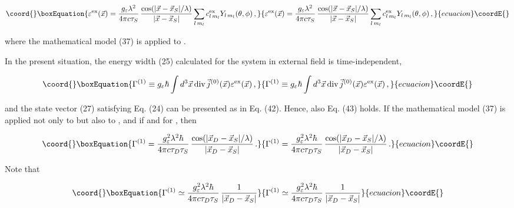 \documentclass[a4paper,12pt]{article}
\begin{document}
\begin{equation}\coord{}\boxEquation{
\varepsilon^{\rm ex}(\vec{x}) = \frac{g_\varepsilon \lambda^2}{4\pi c \tau_S}\, \frac{\cos (|\vec{x}-\vec{x}_S| /\lambda)}{|\vec{x}-\vec{x}_S|}\sum_{l\, m_l} c^{\rm ex}_{l\, m_l} Y_{l\,m_l}(\theta,\phi)\,,
}{
\varepsilon^{\rm ex}(\vec{x}) = \frac{g_\varepsilon \lambda^2}{4\pi c \tau_S}\, \frac{\cos (|\vec{x}-\vec{x}_S| /\lambda)}{|\vec{x}-\vec{x}_S|}\sum_{l\, m_l} c^{\rm ex}_{l\, m_l} Y_{l\,m_l}(\theta,\phi)\,,
}{ecuacion}\coordE{}\end{equation}

\ni where the mathematical model (37) is applied to \coordHE{}.

In the present situation, the energy width (25) calculated for the system in external field is time-independent,
      
\begin{equation}\coord{}\boxEquation{
\Gamma^{(1)} \equiv g_\varepsilon \hbar \int d^3\vec{x}\,{\rm div}\, \vec{j}^{(0)}(\vec{x}) \varepsilon^{\rm ex}(\vec{x}) \,,
}{
\Gamma^{(1)} \equiv g_\varepsilon \hbar \int d^3\vec{x}\,{\rm div}\, \vec{j}^{(0)}(\vec{x}) \varepsilon^{\rm ex}(\vec{x}) \,,
}{ecuacion}\coordE{}\end{equation}

\ni and the state vector (27) satisfying Eq. (24) can be presented as in Eq. (42). Hence, also Eq. (43) holds. If the mathematical model (37) is applied not only to \coordHE{} but also to \coordHE{}, and if \coordHE{} and \coordHE{} for \coordHE{}, then

\begin{equation}\coord{}\boxEquation{
\Gamma^{(1)} = \frac{g^2_\varepsilon \lambda^2 \hbar}{4\pi c \tau_D \tau_S}\, \frac{\cos (|\vec{x}_D - \vec{x}_S| /\lambda)}{|\vec{x}_D - \vec{x}_S|} \,.
}{
\Gamma^{(1)} = \frac{g^2_\varepsilon \lambda^2 \hbar}{4\pi c \tau_D \tau_S}\, \frac{\cos (|\vec{x}_D - \vec{x}_S| /\lambda)}{|\vec{x}_D - \vec{x}_S|} \,.
}{ecuacion}\coordE{}\end{equation}

\ni Note that

\begin{equation}\coord{}\boxEquation{
\Gamma^{(1)} \simeq \frac{g^2_\varepsilon \lambda^2 \hbar}{4\pi c \tau_D \tau_S}\, \frac{1}{|\vec{x}_D - \vec{x}_S|}
}{
\Gamma^{(1)} \simeq \frac{g^2_\varepsilon \lambda^2 \hbar}{4\pi c \tau_D \tau_S}\, \frac{1}{|\vec{x}_D - \vec{x}_S|}
}{ecuacion}\coordE{}\end{equation}
\end{document}
